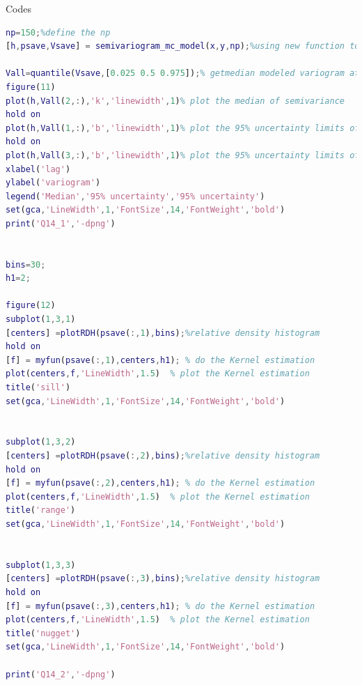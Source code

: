 \documentclass[
	12pt, %
]{fphw}
\begin{document}
Codes
\begin{lstlisting}[language=Matlab,escapeinside=``]
%choose the spherical model with nugget which has smallest RMSE
np=150;%define the np
[h,psave,Vsave] = semivariogram_mc_model(x,y,np);%using new function to obtain the best parameters and variogram results

Vall=quantile(Vsave,[0.025 0.5 0.975]);% getmedian modeled variogram at each lag and 95% uncertainty limits
figure(11)
plot(h,Vall(2,:),'k','linewidth',1)% plot the median of semivariance 
hold on
plot(h,Vall(1,:),'b','linewidth',1)% plot the 95% uncertainty limits of semivariance
hold on
plot(h,Vall(3,:),'b','linewidth',1)% plot the 95% uncertainty limits of semivariance 
xlabel('lag')
ylabel('variogram')
legend('Median','95% uncertainty','95% uncertainty')
set(gca,'LineWidth',1,'FontSize',14,'FontWeight','bold')
print('Q14_1','-dpng')


bins=30;
h1=2;

figure(12)
subplot(1,3,1)
[centers] =plotRDH(psave(:,1),bins);%relative density histogram
hold on
[f] = myfun(psave(:,1),centers,h1); % do the Kernel estimation 
plot(centers,f,'LineWidth',1.5)  % plot the Kernel estimation 
title('sill')
set(gca,'LineWidth',1,'FontSize',14,'FontWeight','bold')


subplot(1,3,2)
[centers] =plotRDH(psave(:,2),bins);%relative density histogram
hold on
[f] = myfun(psave(:,2),centers,h1); % do the Kernel estimation 
plot(centers,f,'LineWidth',1.5)  % plot the Kernel estimation 
title('range')
set(gca,'LineWidth',1,'FontSize',14,'FontWeight','bold')


subplot(1,3,3)
[centers] =plotRDH(psave(:,3),bins);%relative density histogram
hold on
[f] = myfun(psave(:,3),centers,h1); % do the Kernel estimation 
plot(centers,f,'LineWidth',1.5)  % plot the Kernel estimation 
title('nugget')
set(gca,'LineWidth',1,'FontSize',14,'FontWeight','bold')

print('Q14_2','-dpng')

\end{lstlisting}
\end{document}
